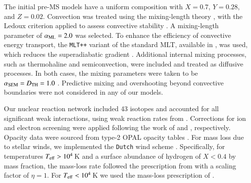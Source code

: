 \documentclass[main.tex]{subfiles}
\begin{document}
    The initial pre-MS models have a uniform composition with $X=0.7$, $Y=0.28$, and $Z=0.02$. Convection was treated using the mixing-length theory \citep[MLT;][]{MLT_Henyey}, with the Ledoux criterion applied to assess convective stability \citep{Ledoux:apj1947}. A mixing-length parameter of $\alpha_{\rm ML}=2.0$ was selected. To enhance the efficiency of convective energy transport, the \texttt{MLT++} variant of the standard MLT, available in \mesa, was used, which reduces the superadiabatic gradient \citep{Paxton:2015jva}. Additional internal mixing processes, such as thermohaline and semiconvection, were included and treated as diffusive processes. In both cases, the mixing parameters were taken to be $\alpha_{\rm SEM} = D_{\rm TH} = 1.0$ \citep{Langer1991, Brown_2013}. Predictive mixing and overshooting beyond convective boundaries were not considered in any of our models.
    
    Our nuclear reaction network included 43 isotopes and accounted for all significant weak interactions, using weak reaction rates from \cite{Suzuki2016}. Corrections for ion and electron screening were applied following the work of \cite{PCR2009} and \cite{Itoh2002}, respectively. Opacity data were sourced from type-2 OPAL opacity tables \citep{OPAL}. For mass loss due to stellar winds, we implemented the \texttt{Dutch} wind scheme \citep{Dutch}. Specifically, for temperatures $T_{\rm eff} > 10^4$\,K and a surface abundance of hydrogen of $X < 0.4$ by mass fraction, the mass-loss rate followed the prescription from \cite{Nugis2000} with a scaling factor of $\eta = 1$. For $T_{\rm eff} < 10^4$\,K we used the mass-loss prescription of \cite{deJager1988}. 
\end{document}

